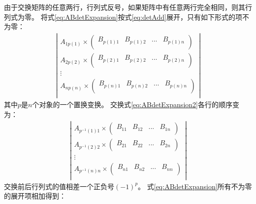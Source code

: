 由于交换矩阵的任意两行，行列式反号，如果矩阵中有任意两行完全相同，则其行列式为零。
将式\ref{eq:ABdetExpansion}按式\ref{eq:detAdd}展开，只有如下形式的项不为零：
\begin{gather}
    \left | \begin{matrix}
    A_{1p(1)}\times\begin{pmatrix}
        B_{p(1)1} & B_{p(1)2} & ... & B_{p(1)n}\\
    \end{pmatrix}\\
    A_{2p(2)}\times\begin{pmatrix}
        B_{p(2)1} & B_{p(2)2} & ... & B_{p(2)n}\\
    \end{pmatrix}\\
    \vdots\\
    A_{np(n)}\times\begin{pmatrix}
        B_{p(n)1} & B_{p(n)2} & ... & B_{p(n)n}\\
    \end{pmatrix}\\
    \end{matrix} \right |
    \label{eq:ABdetExpansion2}
\end{gather}
其中$p$是$n$个对象的一个置换变换。
交换式\ref{eq:ABdetExpansion2}各行的顺序变为：
\begin{gather}
    \left | \begin{matrix}
        A_{p^{-1}(1)1}\times\begin{pmatrix}
            B_{11} & B_{12} & ... & B_{1n}\\
        \end{pmatrix}\\
        A_{p^{-1}(2)2}\times\begin{pmatrix}
            B_{21} & B_{22} & ... & B_{2n}\\
        \end{pmatrix}\\
        \vdots\\
        A_{p^{-1}(n)n}\times\begin{pmatrix}
            B_{n1} & B_{n2} & ... & B_{nn}\\
        \end{pmatrix}\\
    \end{matrix} \right |
\end{gather}
交换前后行列式的值相差一个正负号$(-1)^{p}$。
式\ref{eq:ABdetExpansion}所有不为零的展开项相加得到：
